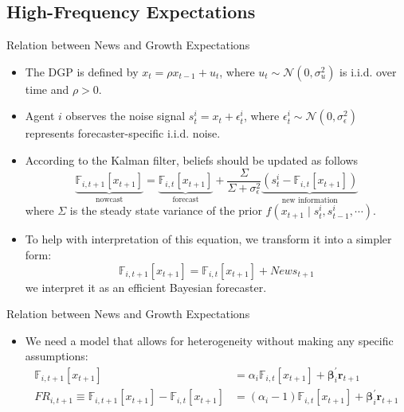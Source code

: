 \documentclass[UTF8, 10pt]{beamer}
\begin{document}
\begin{CJK*}{UTF8}{gbsn}
\section{High-Frequency Expectations}
\begin{frame}{Relation between News and Growth Expectations}
	\begin{itemize}
		\item The \alert{DGP} is defined by $x_{t}=\rho x_{t-1}+u_{t}$, where $u_{t} \sim \mathcal{N}\left(0, \sigma_{u}^{2}\right)$ is i.i.d. over time and $\rho>0$.
		\item Agent $i$ observes the \alert{noise signal} $s_{t}^{i}=x_{t}+\epsilon_{t}^{i}$, where $\epsilon_{t}^{i} \sim \mathcal{N}\left(0, \sigma_{\epsilon}^{2}\right)$ represents forecaster-specific i.i.d. noise.
		\item According to the \alert{Kalman filter}, beliefs should be updated as follows
			$$
			\underbrace{\mathbb{F}_{i, t+1}\left[x_{t+1}\right]}
			    _{\text{nowcast}}
			    =\underbrace{\mathbb{F}_{i, t}\left[x_{t+1}\right]}
			    _{\text{forecast}}
			    +\frac{\Sigma}{\Sigma+\sigma_{\epsilon}^{2}}\underbrace{
			\left(s_{t}^{i}-\mathbb{F}_{i, t}\left[x_{t+1}\right]\right)
			}_{\text{new information}}
			$$
			where $\Sigma$ is the steady state variance of the prior $f(x_{t+1}\mid s_t^i, s_{t-1}^i,\cdots)$.
		\item To help with interpretation of this equation, we transform it into a simpler form:
			$$
			\mathbb{F}_{i, t+1}\left[x_{t+1}\right]
    		= \mathbb{F}_{i, t}\left[x_{t+1}\right]
    		+ \textit{News}_{t+1}
			$$
			we interpret it as an \alert{efficient Bayesian forecaster}.
	\end{itemize}
\end{frame}
\begin{frame}{Relation between News and Growth Expectations}
	\begin{itemize}
		\item We need a model that allows for \alert{heterogeneity} without making any specific assumptions:
			$$
			\begin{aligned}
			\mathbb{F}_{i, t+1}\left[x_{t+1}\right]
		    &= \alpha_i \mathbb{F}_{i, t}\left[x_{t+1}\right]
		    + \boldsymbol{\beta}_i^{\prime}\mathbf{r}_{t+1}
		    \\
		    FR_{i, t+1} \equiv
		    \mathbb{F}_{i, t+1}\left[x_{t+1}\right] - \mathbb{F}_{i, t}\left[x_{t+1}\right]
		    &= (\alpha_i-1) \mathbb{F}_{i, t}\left[x_{t+1}\right]
		    + \boldsymbol{\beta}_i^{\prime}\mathbf{r}_{t+1}
		    \end{aligned}
$$
\end{itemize}
\end{frame}
\end{CJK*}
\end{document}
